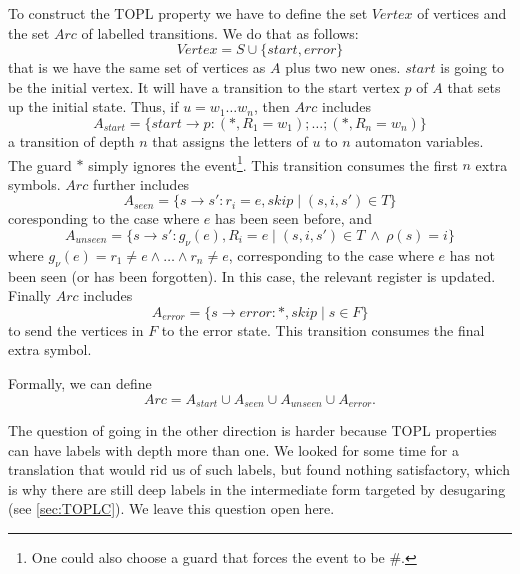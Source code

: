 \newcommand{\Vertex}{\mathit{Vertex}}
\newcommand{\Arc}{\mathit{Arc}}
\newcommand{\sstart}{\mathit{start}}
\newcommand{\serror}{\mathit{error}}
\newcommand{\seen}{\mathit{seen}}
\newcommand{\unseen}{\mathit{unseen}}
To construct the TOPL property we have to define the set $\Vertex$
of vertices and the set $\Arc$ of labelled transitions. We do that as follows:
\[
\Vertex = S \cup \{\sstart, \serror\}
\]
that is we have the same set of vertices as $A$ plus two new
ones. $start$ is going to be the initial vertex. It will have a
transition to the start vertex $p$ of $A$ that sets up the
initial state. Thus, if $u = w_1\ldots w_n$, then $\Arc$ includes
\[
A_{\sstart} = \{\sstart \to p: (*,R_1=w_1);\ldots;(*,R_n=w_n) \}
\]
a transition of depth $n$ that assigns the letters of $u$
to $n$ automaton variables. The guard $*$ simply ignores the
event\footnote{One could also choose a guard that forces the event
to be \#.}. This transition consumes the first $n$ extra
symbols. $\Arc$ further includes
\[
A_{\seen} = \{s\to s': r_i=e, skip \mid (s, i, s') \in T \}
\]
coresponding to the case where $e$ has been seen before, and
\[
A_{unseen} = \{s\to s'{:} g_\nu(e), R_i{=}e \mid (s, i, s') \in T\ \land\ \rho(s){=}i \}
\]
where $g_\nu(e) = r_1 \neq e \land \ldots \land r_n \neq e$,
corresponding to the case where $e$ has not been seen (or has been
forgotten). In this case, the relevant register is
updated. Finally $\Arc$ includes
\[
A_{\serror} = \{s\to \serror: *, skip \mid s\in F \}
\]
to send the vertices in $F$ to the error state. This transition
consumes the final extra symbol.

Formally, we can define
\[
\Arc = A_{\sstart} \cup A_{\seen} \cup A_{\unseen} \cup A_{\serror}.
\]

The question of going in the other direction is harder because TOPL
properties can have labels with depth more than one. We looked for some
time for a translation that would rid us of such labels, but found
nothing satisfactory, which is why there are still deep labels in the
intermediate form targeted by desugaring (see \autoref{sec:TOPLC}). We leave this
question open here.
